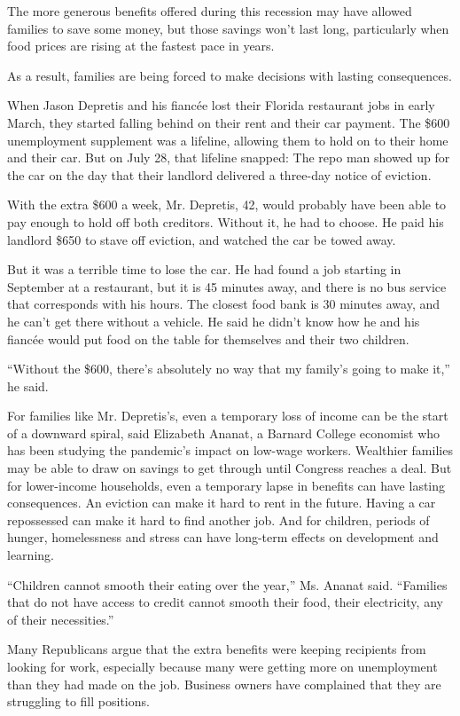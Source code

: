 The more generous benefits offered during this recession may have
allowed families to save some money, but those savings won't last long,
particularly when food prices are rising at the fastest pace in years.

As a result, families are being forced to make decisions with lasting
consequences.

When Jason Depretis and his fiancée lost their Florida restaurant jobs
in early March, they started falling behind on their rent and their car
payment. The \$600 unemployment supplement was a lifeline, allowing them
to hold on to their home and their car. But on July 28, that lifeline
snapped: The repo man showed up for the car on the day that their
landlord delivered a three-day notice of eviction.

With the extra \$600 a week, Mr. Depretis, 42, would probably have been
able to pay enough to hold off both creditors. Without it, he had to
choose. He paid his landlord \$650 to stave off eviction, and watched
the car be towed away.

But it was a terrible time to lose the car. He had found a job starting
in September at a restaurant, but it is 45 minutes away, and there is no
bus service that corresponds with his hours. The closest food bank is 30
minutes away, and he can't get there without a vehicle. He said he
didn't know how he and his fiancée would put food on the table for
themselves and their two children.

``Without the \$600, there's absolutely no way that my family's going to
make it,'' he said.

For families like Mr. Depretis's, even a temporary loss of income can be
the start of a downward spiral, said Elizabeth Ananat, a Barnard College
economist who has been studying the pandemic's impact on low-wage
workers. Wealthier families may be able to draw on savings to get
through until Congress reaches a deal. But for lower-income households,
even a temporary lapse in benefits can have lasting consequences. An
eviction can make it hard to rent in the future. Having a car
repossessed can make it hard to find another job. And for children,
periods of hunger, homelessness and stress can have long-term effects on
development and learning.

``Children cannot smooth their eating over the year,'' Ms. Ananat said.
``Families that do not have access to credit cannot smooth their food,
their electricity, any of their necessities.''

Many Republicans argue that the extra benefits were keeping recipients
from looking for work, especially because many were getting more on
unemployment than they had made on the job. Business owners have
complained that they are struggling to fill positions.

